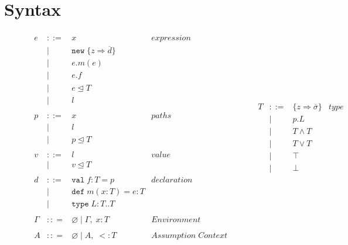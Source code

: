 \documentclass{llncs}
\numberwithin{subcase}{case}
\numberwithin{case}{theorem}
\numberwithin{case}{lemma}
\begin{document}
\section{Syntax}

\begin{figure}[h]
\[
\begin{array}{lll}
\begin{array}{lllr}
e & ::= & x & expression \\
& | & \texttt{new} \; \{z \Rightarrow \overline{d}\}&\\
& | & e.m(e) &\\
& | & e.f &\\
& | & e \unlhd T&\\
& | & l &\\
&&\\
p & ::= & x & paths \\
& | & l &\\
& | & p \unlhd T &\\
&&\\
v & ::= & l & value \\
& | & v \unlhd T &\\
&&\\
d & ::= & \texttt{val} \; f : T = p & declaration \\
  & |   & \texttt{def} \; m(x:T) = e : T &\\
  & |   & \texttt{type} \; L : T .. T&\\
&&\\
\Gamma & :: = & \varnothing \; | \; \Gamma,\; x : T & Environment \\
&&\\
A & :: = & \varnothing \; | \; A,\;  <: T & Assumption \; Context \\
 \end{array}
& ~~~~~~
&
\begin{array}{lllr}
T & ::= & \{z \Rightarrow \overline{\sigma}\} & type \\
& | & p.L &\\
& | & T \wedge T & \\
& | & T \vee T & \\
& | & \top & \\
& | & \bot & \\

\end{array}
\end{array}\]
\end{figure}
\end{document}
